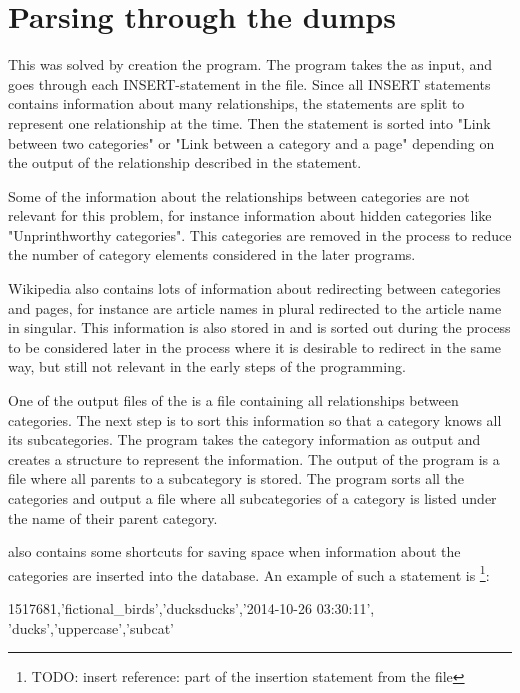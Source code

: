 \section{Parsing through the dumps}
This was solved by creation the program. The program takes the \enwikicatlink as input, and goes through each INSERT-statement in the file. Since all INSERT statements contains information about many relationships, the statements are split to represent one relationship at the time. Then the statement is sorted into "Link between two categories" or "Link between a category and a page" depending on the output of the relationship described in the statement. 

Some of the information about the relationships between categories are not relevant for this problem, for instance information about hidden categories like "Unprinthworthy categories". This categories are removed in the process to reduce the number of category elements considered in the later programs. 

Wikipedia also contains lots of information about redirecting between categories and pages, for instance are article names in plural redirected to the article name in singular.  This information is also stored in \enwikicatlink and is sorted out during the process to be considered later in the process where it is desirable to redirect in the same way, but still not relevant in the early steps of the programming. 

One of the output files of the \catlinkprogram is a file containing all relationships between categories. The next step is to sort this information so that a category knows all its subcategories. The program \catgraphbuilderprogram takes the category information as output and creates a structure to represent the information. The output of the program is a file where all parents to a subcategory is stored. %
The program sorts all the categories and output a file where all subcategories of a category is listed under the name of their parent category.

\enwikicatlink also contains some shortcuts for saving space when information about the categories are inserted into the database. An example of such a statement is \footnote{TODO: insert reference: part of the insertion statement from the file \enwikicatlink}: 

\begin{code}
1517681,'fictional_birds','ducks\nfictional ducks','2014-10-26 03:30:11',
'ducks','uppercase','subcat' 
\end{code}

